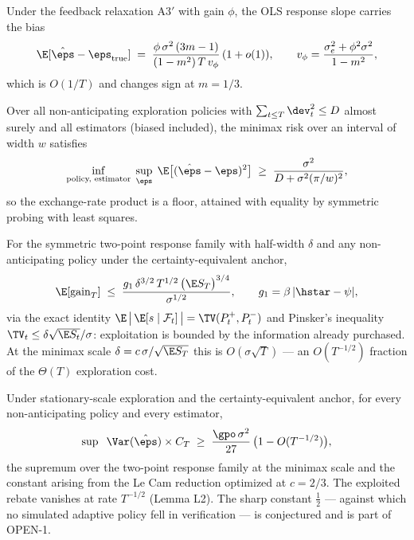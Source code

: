 \documentclass[11pt]{article}
\begin{document}
\begin{proposition}
Under the feedback relaxation A3$'$ with gain $\phi$, the OLS response
slope carries the bias
\[
\E[\hat\eps - \eps_{\mathrm{true}}] \;=\;
\frac{\phi\,\sigma^2\,(3m-1)}{(1-m^2)\,T\,v_\phi}\,(1+o(1)),
\qquad v_\phi = \frac{\sigma_e^2 + \phi^2\sigma^2}{1-m^2},
\]
which is $O(1/T)$ and changes sign at $m = 1/3$.
\end{proposition}

\begin{theorem}
Over all non-anticipating exploration policies with
$\sum_{t\le T} \dev_t^2 \le D$ almost surely and all estimators (biased
included), the minimax risk over an interval of width $w$ satisfies
\[
\inf_{\text{policy, estimator}}\;\sup_{\eps}\;
\E\big[(\hat\eps - \eps)^2\big] \;\ge\;
\frac{\sigma^2}{D + \sigma^2 (\pi/w)^2},
\]
so the exchange-rate product is a floor, attained with equality by
symmetric probing with least squares.
\end{theorem}

\begin{lemma}
For the symmetric two-point response family with half-width $\delta$ and
any non-anticipating policy under the certainty-equivalent anchor,
\[
\E[\mathrm{gain}_T] \;\le\;
\frac{g_1\,\delta^{3/2}\,T^{1/2}\,\big(\E S_T\big)^{3/4}}{\sigma^{1/2}},
\qquad g_1 = \beta\,|\hstar - \psi|,
\]
via the exact identity $\E\,\big|\,\E[s\mid\mathcal{F}_t]\,\big|
= \TV(P^+_t, P^-_t)$ and Pinsker's inequality
$\TV_t \le \delta\sqrt{\E S_t}/\sigma$: exploitation is bounded by the
information already purchased. At the minimax scale
$\delta = c\,\sigma/\sqrt{\E S_T}$ this is $O(\sigma\sqrt{T})$ --- an
$O(T^{-1/2})$ fraction of the $\Theta(T)$ exploration cost.
\end{lemma}

\begin{theorem}
Under stationary-scale exploration and the certainty-equivalent anchor,
for every non-anticipating policy and every estimator,
\[
\sup\;\;\Var(\hat\eps)\times C_T \;\ge\; \frac{\gpo\,\sigma^2}{27}\,
\big(1 - O(T^{-1/2})\big),
\]
the supremum over the two-point response family at the minimax scale and
the constant arising from the Le Cam reduction optimized at $c = 2/3$.
The exploited rebate vanishes at rate $T^{-1/2}$ (Lemma L2). The sharp
constant $\tfrac{1}{2}$ --- against which no simulated adaptive policy
fell in verification --- is conjectured and is part of OPEN-1.
\end{theorem}
\end{document}
